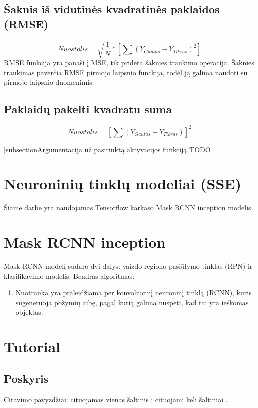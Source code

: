 \documentclass{VUMIFInfKursinis}
\begin{document}
\subsection{Šaknis iš vidutinės kvadratinės paklaidos (RMSE)}
\[
  Nuostolis = \sqrt{\frac{1}{N} * [\sum (Y_{Gautas}-Y_{Tikras})^{2}]}
\]
RMSE funkcija yra panaši į MSE, tik pridėta šaknies traukimo operacija.
Šaknies traukimas paverčia RMSE pirmojo laipsnio funckija, todėl ją galima naudoti
su pirmojo laipsnio duomenimis.

\subsection{Paklaidų pakelti kvadratu suma}
\[
  Nuostolis = [\sum(Y_{Gautas} - Y_{Tikras})]^{2}
\]

]subsection{Argumentacija už pasirinktą aktyvacijos funkciją}
TODO

\section{Neuroninių tinklų modeliai (SSE)}
\par
Šiame darbe yra naudojamas Tensorflow karkaso Mask RCNN inception modelis.
\section{Mask RCNN inception}
\par
Mask RCNN modelį sudaro dvi dalys: vaizdo regiono pasiūlymo tinklas (RPN) ir
klasifikavimo modelis. Bendras algoritmas:
\begin{enumerate}
\item Nuotrauka yra praleidžiama per konvoliucinį neuroninį tinklą (RCNN), kuris
sugeneruoja požymių aibę, pagal kurią galima nuspėti, kad tai yra ieškomas objektas.
\end{enumerate}








\section{Tutorial}
\subsection{Poskyris}
Citavimo pavyzdžiai: cituojamas vienas šaltinis \cite{PvzStraipsnLt}; cituojami
keli šaltiniai \cite{PvzStraipsnEn, PvzKonfLt, PvzKonfEn, PvzKnygLt, PvzKnygEn,
PvzElPubLt, PvzElPubEn, PvzMagistrLt, PvzPhdEn}.
\end{document}
